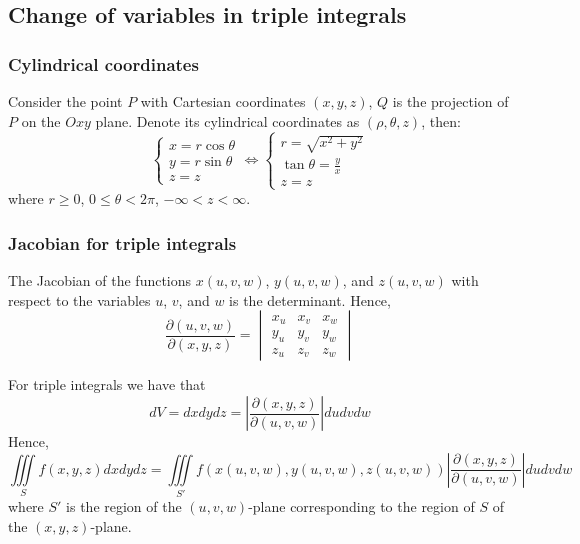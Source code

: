 \documentclass[12pt]{article}
\begin{document}
	\subsection{Change of variables in triple integrals}
		\subsubsection{Cylindrical coordinates}
		Consider the point $P$ with Cartesian coordinates $(x,y,z)$, $Q$ is the projection of $P$ on the $Oxy$ plane. Denote its cylindrical coordinates as $(\rho, \theta, z)$, then:
		\[
			\left\{ 
				\begin{matrix}
					x = r \cos{\theta} \\
					y = r \sin{\theta} \\ 
					z = z
				\end{matrix} 
			\right.
				\iff
			\left\{ 
				\begin{matrix}
					r = \sqrt{x^2 + y^2}  \\
					\tan{\theta} = \frac{y}{x} \\
					z = z
				\end{matrix} 
			\right.
		\]
		where $r \ge 0$, $0 \le \theta < 2 \pi$, $-\infty < z < \infty$.
		
		\subsubsection{Jacobian for triple integrals}
		\begin{defn}
			The Jacobian of the functions $x(u,v,w)$, $y(u,v,w)$, and $z(u,v,w)$ with respect to the variables $u$, $v$, and $w$ is the determinant. Hence,
			\[
				\frac{\partial (u,v,w)}{\partial (x,y,z)} = 
				\begin{vmatrix}
					x_u & x_v & x_w \\
					y_u & y_v & y_w \\
					z_u & z_v & z_w					
				\end{vmatrix} 
			\]
		\end{defn}
		
		For triple integrals we have that 
		\[
			dV = dxdydz = \left| \frac{\partial (x,y,z)}{\partial (u,v,w)} \right| dudvdw
		\]
		Hence,
		\[
			\iiint\limits_S f(x,y,z) dxdydz = \iiint\limits_{S'} f(x(u,v,w), y(u,v,w), z(u,v,w)) \left| \frac{\partial (x,y,z)}{\partial (u,v,w)} \right| dudvdw
		\]
		where $S'$ is the region of the $(u,v,w)$-plane corresponding to the region of $S$ of the $(x,y,z)$-plane.
		
\end{document}
